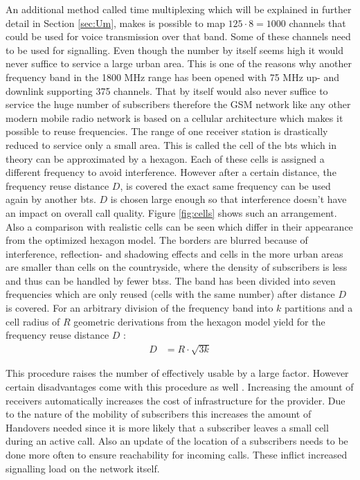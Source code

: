 An additional method called time multiplexing which will be explained in further detail in Section \ref{sec:Um}, makes is possible to map $125 \cdot 8 = 1000$ channels that could be used for voice transmission over that band.
Some of these channels need to be used for signalling.
Even though the number by itself seems high it would never suffice to service a large urban area.
This is one of the reasons why another frequency band in the 1800 MHz range has been opened with 75 MHz up- and downlink supporting 375 channels.
That by itself would also never suffice to service the huge number of subscribers therefore the GSM network like any other modern mobile radio network is based on a cellular architecture which makes it possible to reuse frequencies.
The range of one receiver station is drastically reduced to service only a small area.
This is called the cell of the \gls{bts} which in theory can be approximated by a hexagon.
Each of these cells is assigned a different frequency to avoid interference.
However after a certain distance, the frequency reuse distance $D$, is covered the exact same frequency can be used again by another \gls{bts}.
$D$ is chosen large enough so that interference doesn't have an impact on overall call quality.
Figure \ref{fig:cells} shows such an arrangement.
Also a comparison with realistic cells can be seen which differ in their appearance from the optimized hexagon model.
The borders are blurred because of interference, reflection- and shadowing effects and cells in the more urban areas are smaller than cells on the countryside, where the density of subscribers is less and thus can be handled by fewer \glspl{bts}.
The band has been divided into seven frequencies which are only reused (cells with the same number) after distance $D$ is covered.
For an arbitrary division of the frequency band into $k$ partitions and a cell radius of $R$ geometric derivations from the hexagon model yield for the frequency reuse distance $D$ \cite{GSM2009}:
\begin{align}
D	&=R\cdot\sqrt{3k}
\end{align}

This procedure raises the number of effectively usable by a large factor.
However certain disadvantages come with this procedure as well \cite{protocols1999}.
Increasing the amount of receivers automatically increases the cost of infrastructure for the provider.
Due to the nature of the mobility of subscribers this increases the amount of Handovers needed since it is more likely that a subscriber leaves a small cell during an active call.
Also an update of the location of a subscribers needs to be done more often to ensure reachability for incoming calls.
These inflict increased signalling load on the network itself.


